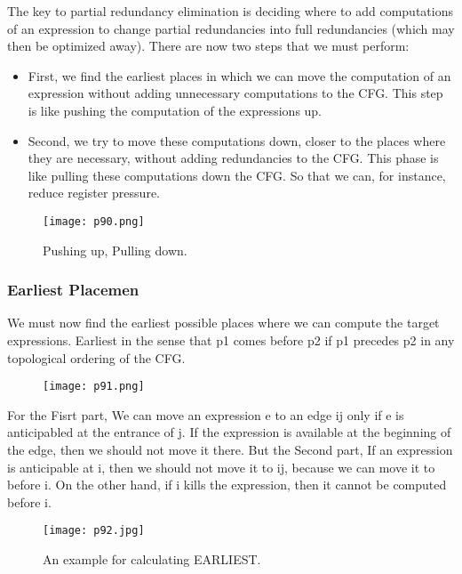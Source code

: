 The key to partial redundancy
elimination is deciding where to add
computations of an expression to
change partial redundancies into full
redundancies (which may then be
optimized away). There	are	now	two	steps	that	we	must	
perform:

\begin{itemize}
\item First,	we	find	the	earliest	places	in	which	
we	can	move	the	computation	of	an	
expression	without	adding	unnecessary	
computations	to	the	CFG.	This	step	is	like	
pushing	the	computation	of	the	
expressions	up.	
\item Second,	we	try	to	move	these	
computations	down,	closer	to	the	places	
where	they	are	necessary,	without	adding	
redundancies	to	the	CFG.	This	phase	is	like	
pulling	these	computations	down	the	CFG. So	that	we	can,	
for	instance,	reduce	register	
pressure.
\end{itemize}

\begin{figure}[H]
    \centering
     \texttt{[image: p90.png]}
         \caption{Pushing up, Pulling down.}
         \label{fig:p90}
\end{figure}

\subsubsection{Earliest	Placemen}

We	must	now	find	the	earliest	possible	places	where	we	
can	compute	the	target	expressions.	Earliest	in	the	sense	that	p1	comes	before	p2	if	p1	precedes	
p2	in	any	topological	ordering	of	the	CFG.

\begin{figure}[H]
    \centering
     \texttt{[image: p91.png]}
         
         \label{fig:p91}
\end{figure}


For the {\color{red} Fisrt} part, We	can	move	an	expression	e	to
an	edge	ij	only	if	e	is	anticipabled	at	the	entrance
of	j.	 If	the	expression	is	available	at	the	beginning	of	the	edge,
then	we	should	not	move	it	there.	
But the {\color{blue} Second} part, If	an	expression	is	anticipable	at	i,	
then	we	should	not	move	it	to	ij,	because	we	can	move	it	to	before	i.	
On	the	other	hand,	if	i	kills	the	expression,	then	it	cannot	
be	computed	before	i.


\begin{figure}[H]
    \centering
     \texttt{[image: p92.jpg]}
         \caption{An example for calculating EARLIEST.}
         \label{fig:p92}
\end{figure}

